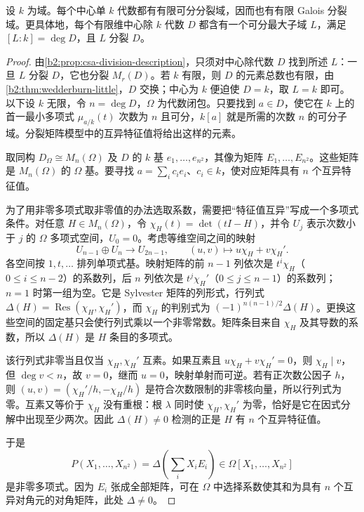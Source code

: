 \begin{theorem}[有限可分分裂域的存在]\label{b2:thm:csa-separable-splitting}
	设 \(k\) 为域。每个中心单 \(k\) 代数都有有限可分分裂域，因而也有有限 Galois 分裂域。更具体地，每个有限维中心除 \(k\) 代数 \(D\) 都含有一个可分最大子域 \(L\)，满足 \([L:k]=\deg D\)，且 \(L\) 分裂 \(D\)。
\end{theorem}
\begin{proof}
	由\cref{b2:prop:csa-division-description}，只须对中心除代数 \(D\) 找到所述 \(L\)：一旦 \(L\) 分裂 \(D\)，它也分裂 \(M_r(D)\)。若 \(k\) 有限，则 \(D\) 的元素总数也有限，由\cref{b2:thm:wedderburn-little}，\(D\) 交换；中心为 \(k\) 便迫使 \(D=k\)，取 \(L=k\) 即可。以下设 \(k\) 无限，令 \(n=\deg D\)，\(\Omega\) 为代数闭包。只要找到 \(a\in D\)，使它在 \(k\) 上的首一最小多项式 \(\mu_{a/k}(t)\) 次数为 \(n\) 且可分，\(k[a]\) 就是所需的次数 \(n\) 的可分子域。分裂矩阵模型中的互异特征值将给出这样的元素。

	取同构 \(D_\Omega\cong M_n(\Omega)\) 及 \(D\) 的 \(k\) 基 \(e_1,\ldots,e_{n^2}\)，其像为矩阵 \(E_1,\ldots,E_{n^2}\)。这些矩阵是 \(M_n(\Omega)\) 的 \(\Omega\) 基。要寻找 \(a=\sum_i c_ie_i\)、\(c_i\in k\)，使对应矩阵具有 \(n\) 个互异特征值。

	为了用非零多项式取非零值的办法选取系数，需要把“特征值互异”写成一个多项式条件。对任意 \(H\in M_n(\Omega)\)，令 \(\chi_H(t)=\det(tI-H)\)，并令 \(U_j\) 表示次数小于 \(j\) 的 \(\Omega\) 多项式空间，\(U_0=0\)。考虑等维空间之间的映射
	\[
		U_{n-1}\oplus U_n\longrightarrow U_{2n-1}, \qquad(u,v)\longmapsto u\chi_H+v\chi_H'.
	\]
	各空间按 \(1,t,\ldots\) 排列单项式基。映射矩阵的前 \(n-1\) 列依次是 \(t^i\chi_H\)（\(0\le i\le n-2\)）的系数列，后 \(n\) 列依次是 \(t^j\chi_H'\)（\(0\le j\le n-1\)）的系数列；\(n=1\) 时第一组为空。它是 Sylvester 矩阵的列形式，行列式 \(\Delta(H)=\operatorname{Res}(\chi_H,\chi_H')\)，而 \(\chi_H\) 的判别式为 \((-1)^{n(n-1)/2}\Delta(H)\)。更换这些空间的固定基只会使行列式乘以一个非零常数。矩阵条目来自 \(\chi_H\) 及其导数的系数，所以 \(\Delta(H)\) 是 \(H\) 条目的多项式。

	该行列式非零当且仅当 \(\chi_H,\chi_H'\) 互素。如果互素且 \(u\chi_H+v\chi_H'=0\)，则 \(\chi_H\mid v\)，但 \(\deg v<n\)，故 \(v=0\)，继而 \(u=0\)，映射单射而可逆。若有正次数公因子 \(h\)，则 \((u,v)=(\chi_H'/h,-\chi_H/h)\) 是符合次数限制的非零核向量，所以行列式为零。互素又等价于 \(\chi_H\) 没有重根：根 \(\lambda\) 同时使 \(\chi_H,\chi_H'\) 为零，恰好是它在因式分解中出现至少两次。因此 \(\Delta(H)\ne0\) 检测的正是 \(H\) 有 \(n\) 个互异特征值。

	于是
	\[
		P(X_1,\ldots,X_{n^2})=\Delta\left(\sum_iX_iE_i\right) \in\Omega[X_1,\ldots,X_{n^2}]
	\]
	是非零多项式。因为 \(E_i\) 张成全部矩阵，可在 \(\Omega\) 中选择系数使其和为具有 \(n\) 个互异对角元的对角矩阵，此处 \(\Delta\ne0\)。


\end{proof}
